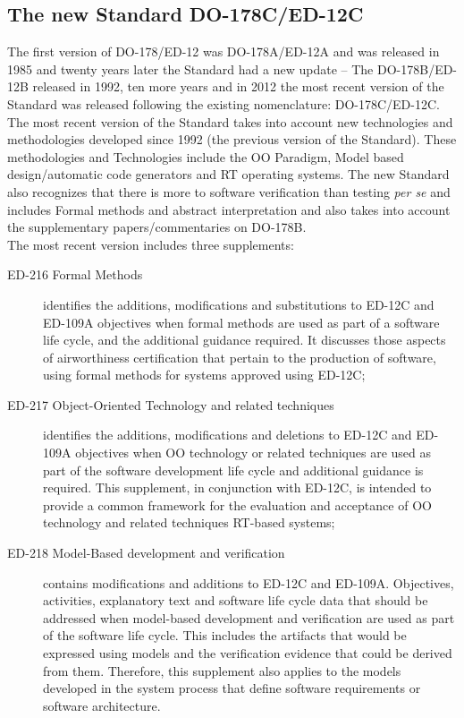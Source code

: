 \subsection{The new Standard DO-178C/ED-12C}\label{sec:new-stand}
The first version of DO-178/ED-12 was DO-178A/ED-12A and was released in 1985 and twenty years later the Standard had a new update -- The DO-178B/ED-12B released in 1992,
ten more years and in 2012 the most recent version of the Standard was released following the existing nomenclature: DO-178C/ED-12C.
The most recent version of the Standard takes into account new technologies and methodologies developed since 1992 (the previous version of the Standard).
These methodologies and Technologies include the \ac{OO} Paradigm, Model based design/automatic code generators and \ac{RT} operating systems.
The new Standard also recognizes that there is more to software verification than testing \textit{per se} and includes Formal methods\cite{Brosgol:2011:DNA:2070337.2070341} and abstract interpretation
and also takes into account the supplementary papers/commentaries on DO-178B.\\
The most recent version includes three supplements: 
\begin{description}
\item[ED-216 Formal Methods] identifies the additions, modifications and substitutions to ED-12C and ED-109A objectives when formal methods are used as part of a software life cycle, and the additional guidance required. It discusses those aspects of airworthiness certification that pertain to the production of software, using formal methods for systems approved using ED-12C;
\item[ED-217 Object-Oriented Technology and related techniques] identifies the additions, modifications and deletions to ED-12C and ED-109A objectives 
when \ac{OO} technology or related techniques are used as part of the software development life cycle and additional guidance is required.
This supplement, in conjunction with ED-12C, is intended to provide a common framework for the evaluation and acceptance of \ac{OO} technology
and related techniques \ac{RT}-based systems;
\item[ED-218 Model-Based development and verification] contains modifications and additions to ED-12C and ED-109A. Objectives, activities, explanatory text and
software life cycle data that should be addressed when model-based development and verification are used as part of the software life cycle.
This includes the artifacts that would be expressed using models and the verification evidence that could be derived from them.
Therefore, this supplement also applies to the models developed in the system process that define software requirements or software architecture.
\end{description}

